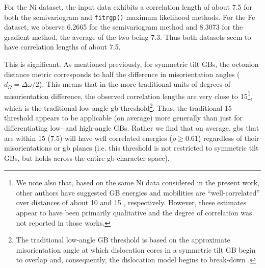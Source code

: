 \documentclass[final,twocolumn,12pt]{elsarticle}
\begin{document}
	
	For the Ni dataset, the input data exhibits a correlation length of about \SI{7.5}{\tobydeg} for both the semivariogram and \texttt{fitrgp()} maximum likelihood methods. For the Fe dataset, we observe \SI{6.2665}{\tobydeg} for the semivariogram method and \SI{8.3073}{\tobydeg} for the gradient method, the average of the two being \SI{7.3}{\tobydeg}. Thus both datasets seem to have correlation lengths of about \SI{7.5}{\tobydeg}. 
	
	This is significant. As mentioned previously, for symmetric tilt GBs, the octonion distance metric corresponds to half the difference in misorientation angles ($d_{\Omega} = \Delta\omega/2$). This means that in the more traditional units of degrees of misorientation difference, the observed correlation lengths are very close to \SI{15}{\misodeg}\footnote{We note also that, based on the same Ni data considered in the present work, other authors have suggested GB energies and mobilities are ``well-correlated'' over distances of about \SI{10}{\misodeg} \cite{rohrerComparingCalculatedMeasured2010} and \SI{15}{\misodeg} \cite{olmstedSurveyComputedGrain2009}, respectively. However, these estimates appear to have been primarily qualitative and the degree of correlation was not reported in those works.}, which is the traditional low-angle \gls{gb} threshold\footnote{The traditional low-angle GB threshold is based on the approximate misorientation angle at which dislocation cores in a symmetric tilt GB begin to overlap and, consequently, the dislocation model \cite{readDislocationModelsCrystal1950} begins to break-down \cite{kingWhatDoesIt2006}.}. Thus, the traditional \SI{15}{\misodeg} threshold appears to be applicable (on average) more generally than just for differentiating low- and high-angle GBs. Rather we find that on average, \glspl{gb} that are within \SI{15}{\misodeg} (\SI{7.5}{\tobydeg}) will have well correlated energies ($\rho \geq 0.61$) regardless of their misorientations or \gls{gb} planes (i.e. this threshold is not restricted to symmetric tilt GBs, but holds across the entire \gls{gb} character space).
	
\end{document}
